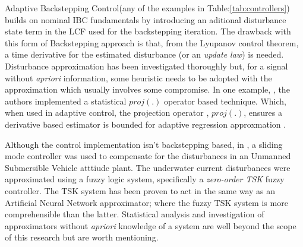 \par
Adaptive Backstepping Control\cite{backstepping}(any of the examples in Table:\ref{tab:controllers}) builds on nominal IBC fundamentals by introducing an aditional disturbance state term in the LCF used for the backstepping iteration. The drawback with this form of Backstepping approach is that, from the Lyupanov control theorem, a time derivative for the estimated disturbance (or an \emph{update law}) is needed. Disturbance approximation has been investigated thoroughly but, for a signal without \emph{apriori} information, some heuristic needs to be adopted with the approximation which usually involves some compromise.
\newpage
In one example, \cite{nonlinearadaptive}, the authors implemented a statistical $proj(.)$ operator based technique. Which, when used in adaptive control, the projection operator \cite{outputfeedback}, $proj(.)$, ensures a derivative based estimator is bounded for adaptive regression approxmation \cite{nonlinearregression}.
\par
Although the control implementation isn't backstepping based, in \cite{adaptiveslidingmode}, a sliding mode controller was used to compensate for the disturbances in an Unmanned Submersible Vehicle atttiude plant. The underwater current disturbances were approximated using a fuzzy logic system, specifically a \emph{zero-order TSK} fuzzy controller. The TSK system has been proven to act in the same way as an Artificial Neural Network approximator\cite{zeroTSK}; where the fuzzy TSK system is more comprehensible than the latter. Statistical analysis and investigation of approximators without \emph{apriori} knowledge of a system are well beyond the scope of this research but are worth mentioning.
